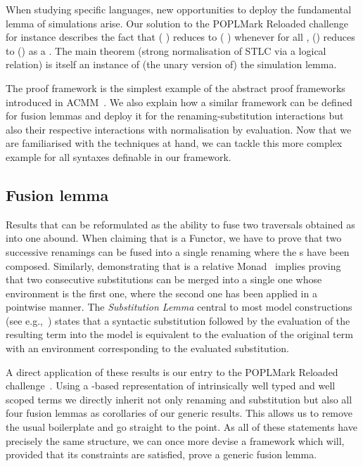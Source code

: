 When studying specific languages, new opportunities to deploy the
fundamental lemma of simulations arise. Our solution to the POPLMark
Reloaded challenge
\citeyear{POPLMarkReloaded2019}
for instance describes the fact that
{( \AB{$\rho$} )}
reduces to {(  )} whenever for all ,
\AB{$\rho$}() reduces to () as a .
The main theorem (strong normalisation of STLC via a logical relation)
is itself an instance of (the unary version of) the simulation lemma.

The  proof framework is the simplest example of the abstract
proof frameworks introduced in ACMM~\citeyear{allais2017type}. We also
explain how a similar framework can be defined
for fusion lemmas and deploy it for the renaming-substitution interactions
but also their respective interactions with normalisation by evaluation.
Now that we are familiarised with the techniques at hand, we can tackle
this more complex example for all syntaxes definable in our framework.



\subsection{Fusion lemma}\label{section:fusion}

Results that can be reformulated as the ability to fuse two traversals
obtained as \semrec{} into one abound. When claiming that  is
a Functor, we have to prove that two successive renamings can be fused into
a single renaming where the s have been composed. Similarly,
demonstrating that  is a relative Monad~\cite{JFR4389} implies proving
that two consecutive substitutions can be merged into a single one whose
environment is the first one, where the second one has been applied in a
pointwise manner. The \emph{Substitution Lemma} central
to most model constructions (see e.g.,~\cite{mitchell1991kripke}) states
that a syntactic substitution followed by the evaluation of the resulting term
into the model is equivalent to the evaluation of the original term with an
environment corresponding to the evaluated substitution.

A direct application of these results is our entry
\citeyear{POPLMarkReloaded2019}
to the
POPLMark Reloaded challenge~\citeyear{poplmarkreloaded}. Using a -based
representation of intrinsically well typed and well scoped terms we directly inherit
not only renaming and substitution but also all four fusion lemmas as corollaries
of our generic results. This allows us to remove the usual boilerplate
and go straight to the point.
As all of these statements have precisely the same structure, we can
once more devise a framework which will, provided that its constraints are
satisfied, prove a generic fusion lemma.

